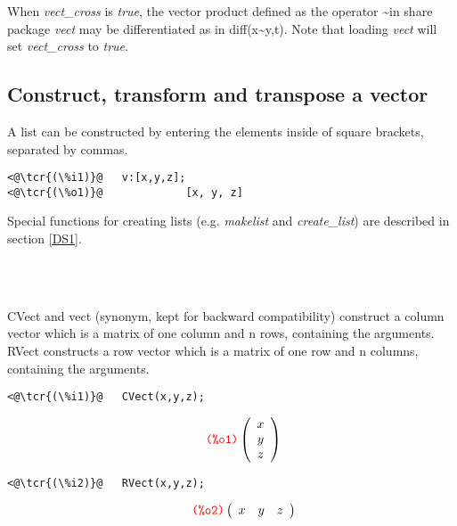 \documentclass[../Maxima_Workbook.tex]{subfiles}
\begin{document}
\lz When \emph{vect\_cross} is \emph{true}, the vector product defined as the operator \textasciitilde in share package \emph{vect} may be differentiated as in diff(x\textasciitilde y,t). Note that loading \emph{vect} will set \emph{vect\_cross} to \emph{true}.

\subsection{Construct, transform and transpose a vector}\label{LA1}

A list can be constructed by entering the elements inside of square brackets, separated by commas. 

\lz \begin{lstlisting}
<@\tcr{(\%i1)}@   v:[x,y,z];
<@\tcr{(\%o1)}@			    [x, y, z]
\end{lstlisting}

\lz Special functions for creating lists (e.g. \emph{makelist} and \emph{create\_list}) are described in section \ref{DS1}.

\lzz {} \hfill {} \\
 \hfill {} \\
 \hfill {}

\lz CVect and vect (synonym, kept for backward compatibility) construct a column vector which is a matrix of one column and n rows, containing the arguments. RVect constructs a row vector which is a matrix of one row and n columns, containing the arguments.

\lz \begin{small}
\color{blue}
\begin{lstlisting}
<@\tcr{(\%i1)}@   CVect(x,y,z);
\end{lstlisting}
\vspace{-6mm} \[\tag*{\tcr{\ttfamily (\%o1)}} \left( \begin{array} {c} x \\ y \\ z \end{array} \right) \]
\vspace{-6mm} \begin{lstlisting}
<@\tcr{(\%i2)}@   RVect(x,y,z);
\end{lstlisting}
\vspace{-6mm} \[\tag*{\tcr{\ttfamily (\%o2)}} \left( \begin{array} {ccc} x & y & z \end{array} \right) \]
\color{black}
\end{small}
\end{document}
